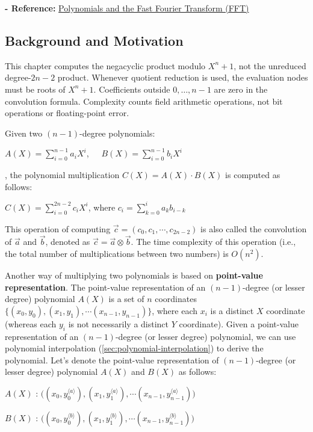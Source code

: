 \textbf{- Reference:} 
\href{http://web.cecs.pdx.edu/~maier/cs584/Lectures/lect07b-11-MG.pdf}{Polynomials and the Fast Fourier Transform (FFT)}~\cite{ntt}

\subsection{Background and Motivation}
\label{subsec:ntt-motivation}

This chapter computes the negacyclic product modulo $X^n+1$, not the unreduced degree-$2n-2$ product. Whenever quotient reduction is used, the evaluation nodes must be roots of $X^n+1$. Coefficients outside $0,\ldots,n-1$ are zero in the convolution formula. Complexity counts field arithmetic operations, not bit operations or floating-point error.

Given two $(n-1)$-degree polynomials:

$A(X) = \sum\limits_{i=0}^{n-1}a_iX^i$, \textcolor{white}{...} $B(X) = \sum\limits_{i=0}^{n-1}b_iX^i$

, the polynomial multiplication $C(X) = A(X)\cdot B(X)$ is computed as follows:

$C(X) = \sum\limits_{i=0}^{2n-2}c_iX^{i}$, where $c_i = \sum\limits_{k=0}^{i}a_kb_{i-k}$

This operation of computing $\vec{c} = (c_0, c_1, \cdots, c_{2n-2})$ is also called the convolution of $\vec a$ and $\vec b$, denoted as $\vec{c} = \vec{a} \otimes \vec{b}$. The time complexity of this operation (i.e., the total number of multiplications between two numbers) is $O(n^2)$.

Another way of multiplying two polynomials is based on \textbf{point-value representation}. The point-value representation of an $(n-1)$-degree (or lesser degree) polynomial $A(X)$ is a set of $n$ coordinates $\{(x_0, y_0), (x_1, y_1), \cdots (x_{n-1}, y_{n-1})\}$, where each $x_i$ is a distinct $X$ coordinate (whereas each $y_i$ is not necessarily a distinct $Y$ coordinate). Given a point-value representation of an $(n-1)$-degree (or lesser degree) polynomial, we can use polynomial interpolation (\autoref{sec:polynomial-interpolation}) to derive the polynomial. 
Let's denote the point-value representation of $(n-1)$-degree (or lesser degree) polynomial $A(X)$ and $B(X)$ as follows:

$A(X)$ : $\bm ( ({x}_0, {y}_0^{\langle a \rangle}), ({x}_1, {y}_1^{\langle a \rangle}), \cdots ({x}_{n-1}, {y}_{n-1}^{\langle a \rangle}) \bm )$

$B(X)$ : $\bm ( ({x}_0, {y}_0^{\langle b \rangle}), ({x}_1, {y}_1^{\langle b \rangle}), \cdots ({x}_{n-1}, {y}_{n-1}^{\langle b \rangle}) \bm )$


